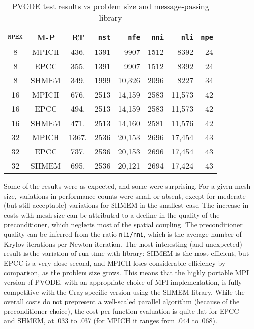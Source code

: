\begin{table}[htb]
\begin{center}
\begin{tabular}{||c|c|c|r|r|r|r|r||}
\hline
${\tt NPEX}$ & M-P & RT & {\tt nst} & {\tt nfe} & {\tt nni} & {\tt nli} & 
{\tt npe} \\ \hline
8 & MPICH & 436. & 1391 & 9907 & 1512 & 8392 & 24 \\ \hline
8 & EPCC & 355. & 1391 & 9907 & 1512 & 8392 & 24 \\ \hline
8 & SHMEM & 349. & 1999 & 10,326 & 2096 & 8227 & 34 \\ \hline\hline
16 & MPICH & 676. & 2513 & 14,159 & 2583 & 11,573 & 42 \\ \hline
16 & EPCC & 494. & 2513 & 14,159 & 2583 & 11,573 & 42 \\ \hline
16 & SHMEM & 471. & 2513 & 14,160 & 2581 & 11,576 & 42 \\ \hline\hline
32 & MPICH & 1367. & 2536 & 20,153 & 2696 & 17,454 & 43 \\ \hline
32 & EPCC & 737. & 2536 & 20,153 & 2696 & 17,454 & 43 \\ \hline
32 & SHMEM & 695. & 2536 & 20,121 & 2694 & 17,424 & 43 \\ \hline
\end{tabular}
\label{table1}
\end{center}
\caption{PVODE test results vs problem size and message-passing library}
\end{table}

Some of the results were as expected, and some were surprising. For a given
mesh size, variations in performance counts were small or absent, except for
moderate (but still acceptable) variations for SHMEM in the smallest case.
The increase in costs with mesh size can be attributed to a decline in the
quality of the preconditioner, which neglects most of the spatial coupling.
The preconditioner quality can be inferred from the ratio {\tt nli/nni},
which is the average number of Krylov iterations per Newton iteration. The
most interesting (and unexpected) result is the variation of run time with
library: SHMEM is the most efficient, but EPCC is a very close second, and
MPICH loses considerable efficiency by comparison, as the problem size
grows. This means that the highly portable MPI version of PVODE, with an
appropriate choice of MPI implementation, is fully competitive with the
Cray-specific version using the SHMEM library. While the overall costs do
not prepresent a well-scaled parallel algorithm (because of the
preconditioner choice), the cost per function evaluation is quite flat for
EPCC and SHMEM, at .033 to .037 (for MPICH it ranges from .044 to .068).

